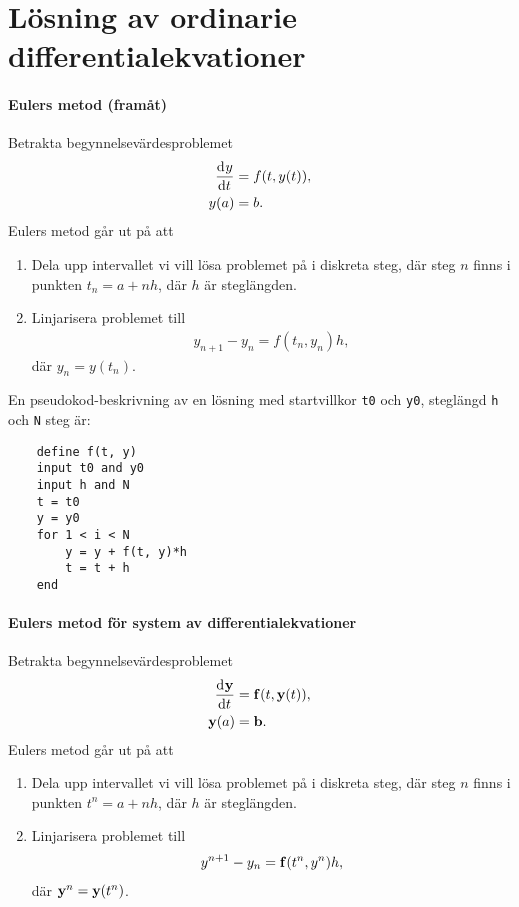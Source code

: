 \section{Lösning av ordinarie differentialekvationer}

\paragraph{Eulers metod (framåt)}
Betrakta begynnelsevärdesproblemet
\begin{align*}
	\dv[]{y}{t} (t) &= f(t, y(t)), \\
	y(a)            &= b.
\end{align*}
Eulers metod går ut på att
\begin{enumerate}
	\item Dela upp intervallet vi vill lösa problemet på i diskreta steg, där steg $n$ finns i punkten $t_{n} = a + nh$, där $h$ är steglängden.
	\item Linjarisera problemet till
	\begin{align*}
		y_{n + 1} - y_{n} = f(t_{n}, y_{n})h,
	\end{align*}
	där $y_{n} = y(t_{n})$.
\end{enumerate}

En pseudokod-beskrivning av en lösning med startvillkor \verb|t0| och \verb|y0|, steglängd \verb|h| och \verb|N| steg är:
\begin{lstlisting}
	define f(t, y)
	input t0 and y0
	input h and N
	t = t0
	y = y0
	for 1 < i < N
		y = y + f(t, y)*h
		t = t + h
	end
\end{lstlisting}

\paragraph{Eulers metod för system av differentialekvationer}
Betrakta begynnelsevärdesproblemet
\begin{align*}
	\dv[]{\vb{y}}{t} (t) &= \vb{f}(t, \vb{y}(t)), \\
	\vb{y}(a)            &= \vb{b}.
\end{align*}
Eulers metod går ut på att
\begin{enumerate}
	\item Dela upp intervallet vi vill lösa problemet på i diskreta steg, där steg $n$ finns i punkten $t^{n} = a + nh$, där $h$ är steglängden.
	\item Linjarisera problemet till
	\begin{align*}
		y^{n + 1} - y_{n} = \vb{f}(t^{n}, y^{n})h,
	\end{align*}
	där $\vb{y}^{n} = \vb{y}(t^{n})$.
\end{enumerate}

